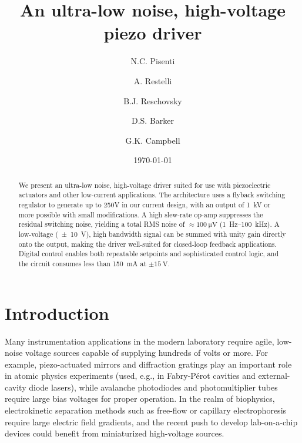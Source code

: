 \documentclass[aip,rsi,reprint]{revtex4-1} %
\begin{document}
\title{An ultra-low noise, high-voltage piezo driver}

\author{N.C. Pisenti}
\author{A. Restelli}
\author{B.J. Reschovsky}
\author{D.S. Barker}
\author{G.K. Campbell}

\date{\today}

\begin{abstract}
We present an ultra-low noise, high-voltage driver suited for use with piezoelectric actuators and other low-current applications. 
The architecture uses a flyback switching regulator to generate up to 250V in our current design, with an output of \SI{1}{\kilo\volt} or more possible with small modifications. 
A high slew-rate op-amp suppresses the residual switching noise, yielding a total RMS noise of $\approx\SI{100}{\micro\volt}$ (\SI{1}{\hertz}--\SI{100}{\kilo\hertz}).
A low-voltage (\SI{\pm 10}{\volt}), high bandwidth signal can be summed with unity gain directly onto the output, making the driver well-suited for closed-loop feedback applications.
Digital control enables both repeatable setpoints and sophisticated control logic, and the circuit consumes less than \SI{150}{\milli\ampere} at $\pm\SI{15}{\volt}$.
\end{abstract}

\pacs{}%

\maketitle %


\section{Introduction}
\label{Sec:Introduction}

Many instrumentation applications in the modern laboratory require agile, low-noise voltage sources capable of supplying hundreds of volts or more.
For example, piezo-actuated mirrors and diffraction gratings play an important role in atomic physics experiments (used, e.g., in Fabry-P\'{e}rot cavities\cite{Riedle1994a,Bohlouli-Zanjani2006a} and external-cavity diode lasers\cite{Wieman1991a}), while avalanche photodiodes and photomultiplier tubes require large bias voltages for proper operation.
In the realm of biophysics, electrokinetic separation methods such as free-flow or capillary electrophoresis\cite{Kohlheyer2008a} require large electric field gradients, and the recent push to develop lab-on-a-chip devices could benefit from miniaturized high-voltage sources.\cite{Temiz2015a}
\end{document}
